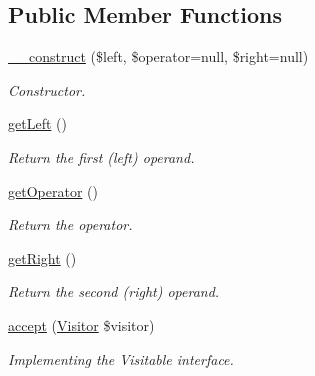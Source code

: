 \subsection*{Public Member Functions}
\begin{DoxyCompactItemize}
\item 
\hyperlink{classMathParser_1_1Parsing_1_1Nodes_1_1ExpressionNode_ad225055b7e075eabc33c0f7bfd4253cb}{\-\_\-\-\_\-construct} (\$left, \$operator=null, \$right=null)
\begin{DoxyCompactList}\small\item\em Constructor. \end{DoxyCompactList}\item 
\hyperlink{classMathParser_1_1Parsing_1_1Nodes_1_1ExpressionNode_a8e50a23c59679015c5e45b723d7bcb7d}{get\-Left} ()
\begin{DoxyCompactList}\small\item\em Return the first (left) operand. \end{DoxyCompactList}\item 
\hyperlink{classMathParser_1_1Parsing_1_1Nodes_1_1ExpressionNode_afeb588203d9912983be68c68aaad8a87}{get\-Operator} ()
\begin{DoxyCompactList}\small\item\em Return the operator. \end{DoxyCompactList}\item 
\hyperlink{classMathParser_1_1Parsing_1_1Nodes_1_1ExpressionNode_af0a80f6914435eee930199efb29579dd}{get\-Right} ()
\begin{DoxyCompactList}\small\item\em Return the second (right) operand. \end{DoxyCompactList}\item 
\hypertarget{classMathParser_1_1Parsing_1_1Nodes_1_1ExpressionNode_a3794b9185ed7928df1f39ec42c557106}{\hyperlink{classMathParser_1_1Parsing_1_1Nodes_1_1ExpressionNode_a3794b9185ed7928df1f39ec42c557106}{accept} (\hyperlink{interfaceMathParser_1_1Interpreting_1_1Visitors_1_1Visitor}{Visitor} \$visitor)}\label{classMathParser_1_1Parsing_1_1Nodes_1_1ExpressionNode_a3794b9185ed7928df1f39ec42c557106}

\begin{DoxyCompactList}\small\item\em Implementing the Visitable interface. \end{DoxyCompactList}\end{DoxyCompactItemize}
